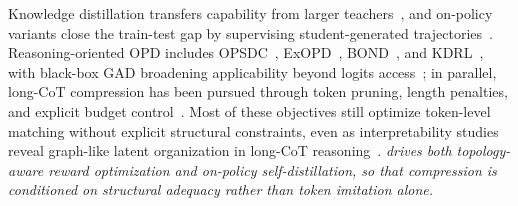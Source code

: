 Knowledge distillation transfers capability from larger teachers~\citep{hinton2015distilling}, and on-policy variants close the train-test gap by supervising student-generated trajectories~\citep{minillm2023,agarwal2024gkd,ko2024distillm,song2026opdsurvey}. Reasoning-oriented OPD includes OPSDC~\citep{opsdc2026}, ExOPD~\citep{yang2026exopd}, BOND~\citep{sessa2024bond}, and KDRL~\citep{xu2025kdrl}, with black-box GAD broadening applicability beyond logits access~\citep{ye2025gad}; in parallel, long-CoT compression has been pursued through token pruning, length penalties, and explicit budget control~\citep{xia2025tokenskip,luo2025o1,arora2026training,aggarwal2025l1,muennighoff2025s1}. Most of these objectives still optimize token-level matching without explicit structural constraints, even as interpretability studies reveal graph-like latent organization in long-CoT reasoning~\citep{yao2023tree,besta2024graph,zhong2026chains2dags}. \textit{\method drives both topology-aware reward optimization and on-policy self-distillation, so that compression is conditioned on structural adequacy rather than token imitation alone.}
